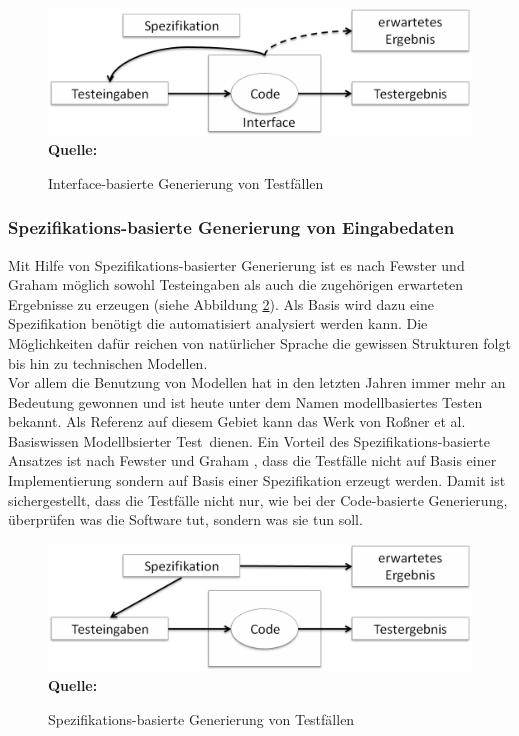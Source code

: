 \begin{figure}[htb]
  \centering  
  \includegraphics[scale=0.6]{img/interfaceBasedDesign.png}\\
  \footnotesize\sffamily\textbf{Quelle:} \cite[vgl. S. 20]{fewster_software_1999}
  \caption{Interface-basierte Generierung von Testfällen}
  \label{fig:interfaceBasedDesign}
\end{figure}


\subsubsection{Spezifikations-basierte Generierung von Eingabedaten}
\label{subsubsec:spezifikationsbasierte_generierung}
Mit Hilfe von Spezifikations-basierter Generierung ist es nach Fewster und Graham \cite[vgl. S. 21]{fewster_software_1999} möglich sowohl Testeingaben als auch die zugehörigen erwarteten Ergebnisse zu erzeugen (siehe Abbildung \ref{fig:specBasedDesign}). Als Basis wird dazu eine Spezifikation benötigt die automatisiert analysiert werden kann. Die Möglichkeiten dafür reichen von natürlicher Sprache die gewissen Strukturen folgt bis hin zu technischen Modellen.\\ Vor allem die Benutzung von Modellen hat in den letzten Jahren immer mehr an Bedeutung gewonnen und ist heute unter dem Namen modellbasiertes Testen bekannt. Als Referenz auf diesem Gebiet kann das Werk von Roßner et al.\ \cite{rossner_basiswissen_2010} \glqq Basiswissen Modellbsierter Test\grqq\ dienen.
Ein Vorteil des Spezifikations-basierte Ansatzes ist nach Fewster und Graham \cite[vgl. S. 21]{fewster_software_1999}, dass die Testfälle nicht auf Basis einer Implementierung sondern auf Basis einer Spezifikation erzeugt werden. Damit ist sichergestellt, dass die Testfälle nicht nur, wie bei der Code-basierte Generierung, überprüfen \grq was die Software tut\grq , sondern \grq was sie tun soll\grq.

\begin{figure}[htb]
  \centering  
  \includegraphics[scale=0.6]{img/specBasedDesign.png}\\
  \footnotesize\sffamily\textbf{Quelle:} \cite[vgl. S. 21]{fewster_software_1999}
  \caption{Spezifikations-basierte Generierung von Testfällen}
  \label{fig:specBasedDesign}
\end{figure}

